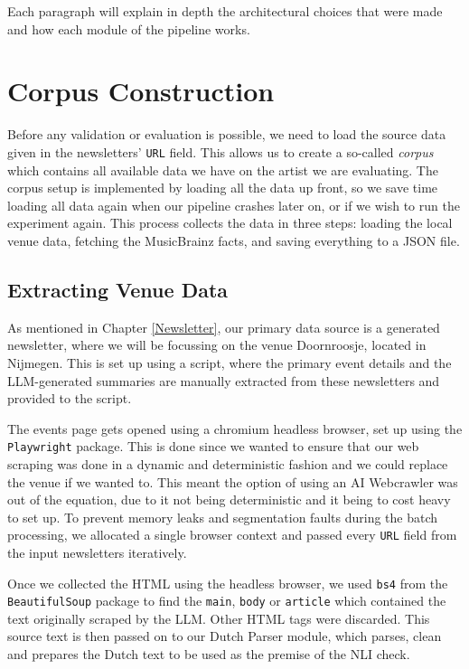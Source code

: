 Each paragraph will explain in depth the architectural choices that were made and how each module of the pipeline works. 

\section{Corpus Construction} \label{rsh:datacorpus}
Before any validation or evaluation is possible, we need to load the source data given in the newsletters' \texttt{URL} field. This allows us to create a so-called \textit{corpus} which contains all available data we have on the artist we are evaluating. The corpus setup is implemented by loading all the data up front, so we save time loading all data again when our pipeline crashes later on, or if we wish to run the experiment again. This process collects the data in three steps: loading the local venue data, fetching the MusicBrainz facts, and saving everything to a JSON file.

\subsection{Extracting Venue Data}
As mentioned in Chapter \ref{Newsletter}, our primary data source is a generated newsletter, where we will be focussing on the venue Doornroosje, located in Nijmegen. This is set up using a script, where the primary event details and the LLM-generated summaries are manually extracted from these newsletters and provided to the script.

The events page gets opened using a chromium headless browser, set up using the \texttt{Playwright} package. This is done since we wanted to ensure that our web scraping was done in a dynamic and deterministic fashion and we could replace the venue if we wanted to. This meant the option of using an AI Webcrawler was out of the equation, due to it not being deterministic and it being to cost heavy to set up. To prevent memory leaks and segmentation faults during the batch processing, we allocated a single browser context and passed every \texttt{URL} field from the input newsletters iteratively. 

Once we collected the HTML using the headless browser, we used \texttt{bs4} from the \texttt{BeautifulSoup} package to find the \texttt{main},  \texttt{body} or  \texttt{article} which contained the text originally scraped by the LLM. Other HTML tags were discarded. This source text is then passed on to our Dutch Parser module, which parses, clean and prepares the Dutch text to be used as the premise of the NLI check. 

